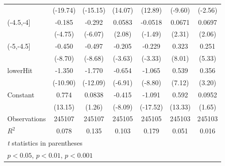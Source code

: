 {\begin{tabular}{l*{6}{c}}
                    &    (-19.74)         &    (-15.15)         &     (14.07)         &     (12.89)         &     (-9.60)         &     (-2.56)         \\
[1em]
(-4.5,-4]           &      -0.185\sym{***}&      -0.292\sym{***}&      0.0583\sym{*}  &     -0.0518         &      0.0671\sym{*}  &      0.0697\sym{*}  \\
                    &     (-4.75)         &     (-6.07)         &      (2.08)         &     (-1.49)         &      (2.31)         &      (2.06)         \\
[1em]
(-5,-4.5]           &      -0.450\sym{***}&      -0.497\sym{***}&      -0.205\sym{***}&      -0.229\sym{***}&       0.323\sym{***}&       0.251\sym{***}\\
                    &     (-8.70)         &     (-8.68)         &     (-3.63)         &     (-3.33)         &      (8.01)         &      (5.33)         \\
[1em]
lowerHit            &      -1.350\sym{***}&      -1.770\sym{***}&      -0.654\sym{***}&      -1.065\sym{***}&       0.539\sym{***}&       0.356\sym{**} \\
                    &    (-10.90)         &    (-12.09)         &     (-6.91)         &     (-8.80)         &      (7.12)         &      (3.20)         \\
[1em]
Constant            &       0.774\sym{***}&      0.0838         &      -0.415\sym{***}&      -1.091\sym{***}&       0.592\sym{***}&      0.0952         \\
                    &     (13.15)         &      (1.26)         &     (-8.09)         &    (-17.52)         &     (13.33)         &      (1.65)         \\
\hline
Observations        &      245107         &      245107         &      245105         &      245105         &      245103         &      245103         \\
\(R^{2}\)           &       0.078         &       0.135         &       0.103         &       0.179         &       0.051         &       0.016         \\
\hline\hline
\multicolumn{7}{l}{\footnotesize \textit{t} statistics in parentheses}\\
\multicolumn{7}{l}{\footnotesize \sym{*} \(p<0.05\), \sym{**} \(p<0.01\), \sym{***} \(p<0.001\)}\\
\end{tabular}
}
